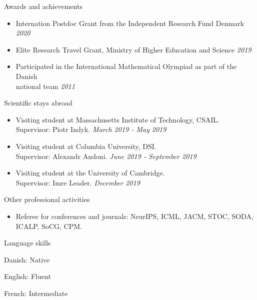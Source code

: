 \documentclass{resume} %
\begin{document}

\begin{rSection}{Awards and achievements}
\begin{itemize}
\item Internation Postdoc Grant from the Independent Research Fund Denmark  \hfill{\emph{2020}} 
\item Elite Research Travel Grant, Ministry of Higher Education and Science  \hfill{\emph{2019}} 
\item Participated in the International Mathematical Olympiad as part of the Danish \\ national team  \hfill{\emph{2011}}
\end{itemize}
\end{rSection}

\begin{rSection}{Scientific stays abroad}
\begin{itemize}
\item Visiting student at Massachusetts Institute of Technology, CSAIL. \\Supervisor: Piotr Indyk. \hfill{\emph{March 2019 - May 2019}}
\item Visiting student at Columbia University, DSI. \\ Supervisor: Alexandr Andoni. \hfill{\emph{June 2019 - September 2019}}
\item Visiting student at the University of Cambridge.  \\Supervisor: Imre Leader. \hfill{\emph{December 2019}}
\end{itemize}

\end{rSection}


\begin{rSection}{Other professional activities}
\begin{itemize}
\item Referee for conferences and journals: NeurIPS, ICML, JACM, STOC, SODA, ICALP, SoCG, CPM.
\end{itemize}

\end{rSection}


\begin{rSection}{Language skills}
\item Danish: Native
\item English: Fluent
\item French: Intermediate
\end{rSection}




\end{document}
